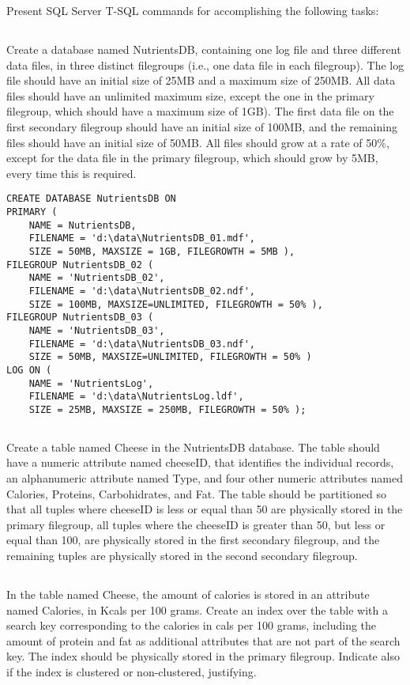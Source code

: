 	{\color{gray}Present SQL Server T-SQL commands for accomplishing the following tasks:}
	\subsection{}
	{\color{gray}Create a database named NutrientsDB, containing one log file and three different data files, in three distinct filegroups (i.e., one data file in each filegroup). The log file should have an initial size of 25MB and a maximum size of 250MB. All data files should have an unlimited maximum size, except the one in the primary filegroup, which should have a maximum size of 1GB). The first data file on the first secondary filegroup should have an initial size of 100MB, and the remaining files should have an initial size of 50MB. All files should grow at a rate of 50\%, except for the data file in the primary filegroup, which should grow by 5MB, every time this is required.}

\begin{lstlisting}
CREATE DATABASE NutrientsDB ON 
PRIMARY (
	NAME = NutrientsDB,
	FILENAME = 'd:\data\NutrientsDB_01.mdf',
	SIZE = 50MB, MAXSIZE = 1GB, FILEGROWTH = 5MB ),
FILEGROUP NutrientsDB_02 (
	NAME = 'NutrientsDB_02', 
	FILENAME = 'd:\data\NutrientsDB_02.ndf', 
	SIZE = 100MB, MAXSIZE=UNLIMITED, FILEGROWTH = 50% ),
FILEGROUP NutrientsDB_03 (
	NAME = 'NutrientsDB_03', 
	FILENAME = 'd:\data\NutrientsDB_03.ndf', 
	SIZE = 50MB, MAXSIZE=UNLIMITED, FILEGROWTH = 50% )
LOG ON (
	NAME = 'NutrientsLog',
	FILENAME = 'd:\data\NutrientsLog.ldf',
	SIZE = 25MB, MAXSIZE = 250MB, FILEGROWTH = 50% );
\end{lstlisting}

	\subsection{}
	{\color{gray}Create a table named Cheese in the NutrientsDB database. The table should have a numeric attribute named cheeseID, that identifies the individual records, an alphanumeric attribute named Type, and four other numeric attributes named Calories, Proteins, Carbohidrates, and Fat. The table should be partitioned so that all tuples where cheeseID is less or equal than 50 are physically stored in the primary filegroup, all tuples where the cheeseID is greater than 50, but less or equal than 100, are physically stored in the first secondary filegroup, and the remaining tuples are physically stored in the second secondary filegroup.}

	\subsection{}
	{\color{gray}In the table named Cheese, the amount of calories is stored in an attribute named Calories, in Kcals per 100 grams. Create an index over the table with a search key corresponding to the calories in cals per 100 grams, including the amount of protein and fat as additional attributes that are not part of the search key. The index should be physically stored in the primary filegroup. Indicate also if the index is clustered or non-clustered, justifying.}

